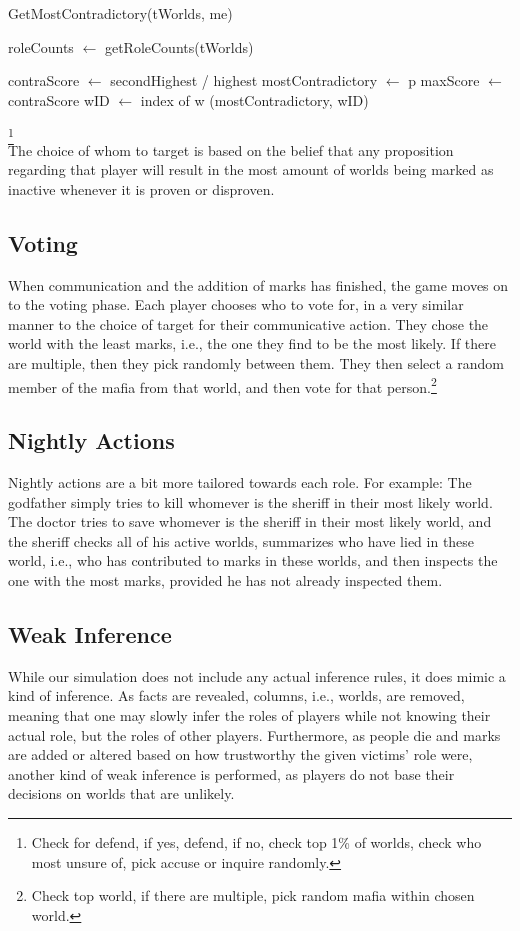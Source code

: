 \begin{algorithm}[H]
	\caption{GetMostContradictory(tWorlds, me)}
	\begin{algorithmic}
		\State roleCounts $\gets$ getRoleCounts(tWorlds)

		\State contraScore $\gets$ secondHighest / highest
		\State mostContradictory $\gets$ p
		\State maxScore $\gets$ contraScore
		\State wID $\gets$ index of w
		\EndIf
		\EndFor
		\EndFor
		\State \Return (mostContradictory, wID)
	\end{algorithmic}
\end{algorithm}
\footnote[1]{Check for defend, if yes,
	defend, if no, check top 1\% of worlds, check who most unsure of, pick accuse
	or inquire randomly.}\\
The choice of whom to target is based on the belief that any proposition
regarding that player will result in the most amount of worlds being marked as
inactive whenever it is proven or disproven.
\subsection{Voting}\label{Voting}
When communication and the addition of marks has finished, the game moves on to
the voting phase. Each player chooses who to vote for, in a very similar manner
to the choice of target for their communicative action. They chose the world
with the least marks, i.e., the one they find to be the most likely. If there
are multiple, then they pick randomly between them. They then select a random
member of the mafia from that world, and then vote for that
person.\footnote[2]{ Check top world, if there are multiple, pick
	random mafia within chosen world.}
\subsection{Nightly Actions}\label{NightlyActions}
Nightly actions are a bit more tailored towards each role. For example: The
godfather simply tries to kill whomever is the sheriff in their most likely
world. The doctor tries to save whomever is the sheriff in their most likely
world, and the sheriff checks all of his active worlds, summarizes who have
lied in these world, i.e., who has contributed to marks in these worlds, and
then inspects the one with the most marks, provided he has not already
inspected them.
\subsection{Weak Inference}\label{WeakInference}
While our simulation does not include any actual inference rules, it does mimic
a kind of inference. As facts are revealed, columns, i.e., worlds, are removed,
meaning that one may slowly infer the roles of players while not knowing their
actual role, but the roles of other players. Furthermore, as people die and
marks are added or altered based on how trustworthy the given victims' role
were, another kind of weak inference is performed, as players do not base their
decisions on worlds that are unlikely.
